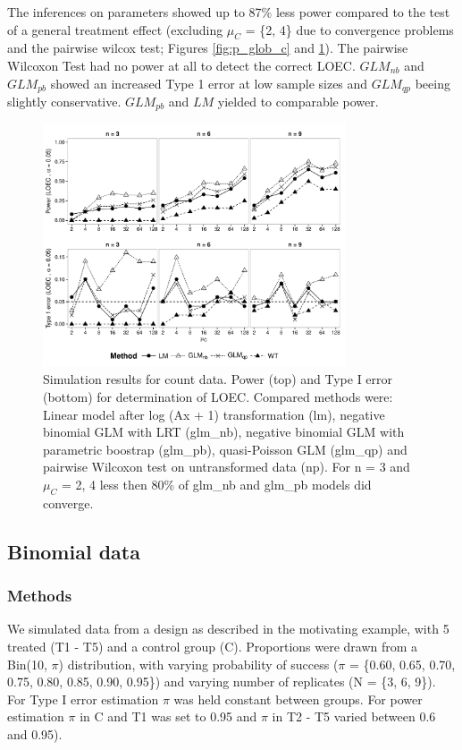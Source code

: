\documentclass{scrartcl}
\begin{document}
The inferences on parameters showed up to 87\% less power compared to the test of a general treatment effect (excluding $\mu_C$ = \{2, 4\} due to convergence problems and the pairwise wilcox test; Figures \ref{fig:p_glob_c} and \ref{fig:p_loec_c}).
The pairwise Wilcoxon Test had no power at all to detect the correct LOEC.
$GLM_{nb}$ and $GLM_{pb}$ showed an increased Type 1 error at low sample sizes and $GLM_{qp}$ beeing slightly conservative.
$GLM_{pb}$ and $LM$ yielded to comparable power.

\begin{figure}[h]
  \centering
  \includegraphics[width = 0.8\textwidth]{p_loec_c.pdf}
  \caption{Simulation results for count data. Power (top) and Type I error (bottom) for determination of LOEC. Compared methods were: Linear model after log (Ax + 1) transformation (lm), negative binomial GLM with LRT (glm\_nb), negative binomial GLM with parametric boostrap (glm\_pb), quasi-Poisson GLM (glm\_qp) and pairwise Wilcoxon test on untransformed data (np). For n = 3 and $\mu_C$ = {2, 4} less then 80\% of glm\_nb and glm\_pb models did converge.}
  \label{fig:p_loec_c}
\end{figure}



\subsection{Binomial data}
\subsubsection{Methods}
We simulated data from a design as described in the motivating example, with 5 treated (T1 - T5) and a control group (C). 
Proportions were drawn from a Bin(10, $\pi$) distribution, with varying probability of success ($\pi$ = \{0.60, 0.65, 0.70, 0.75, 0.80, 0.85, 0.90, 0.95\}) and varying number of replicates (N = \{3, 6, 9\}).
For Type I error estimation $\pi$ was held constant between groups.
For power estimation $\pi$ in C and T1 was set to 0.95 and $\pi$ in T2 - T5 varied between 0.6 and 0.95). 
 
\end{document}
